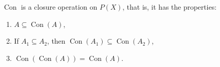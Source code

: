 $\operatorname{Con}$ is a closure operation on $P(X)$, that is, it has the properties:
\begin{enumerate}
\item $A \subseteq \operatorname{Con}(A)$,
\item If $A_1 \subseteq A_2$, then $\operatorname{Con}(A_1) \subseteq \operatorname{Con}(A_2)$,
\item $\operatorname{Con}(\operatorname{Con}(A)) = \operatorname{Con}(A)$.
\end{enumerate}
